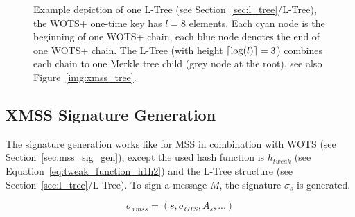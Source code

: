\begin{figure}
\caption{Example depiction of one L-Tree (see Section~\ref{sec:l_tree}/L-Tree), the WOTS+ one-time key has $l=8$ elements. Each \textcolor{cyan_tud}{cyan node} is the beginning of one WOTS+ chain, each \textcolor{darkblue_tud}{blue node} denotes the end of one WOTS+ chain. The L-Tree (with height $\lceil\log(l)\rceil=3$) combines each chain to one Merkle tree child (\textcolor{grey_tud}{grey node} at the root), see also Figure~\ref{img:xmss_tree}.
} 
\label{img:l_tree}
\end{figure}

\subsection{XMSS Signature Generation}
The signature generation works like for MSS in combination with WOTS (see Section~\ref{sec:mss_sig_gen}), except the used hash function is $h_{tweak}$ (see Equation~\ref{eq:tweak_function_h1h2}) and the L-Tree structure (see Section~\ref{sec:l_tree}/L-Tree). 
To sign a message $M$, the signature $\sigma_s$ is generated. 


\begin{equation}
\label{eq:xmss_sign}
\sigma_{xmss} = (s, \sigma_{OTS}, A_s, ...) 
\end{equation}

